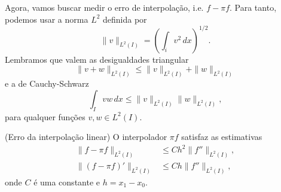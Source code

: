Agora, vamos buscar medir o erro de interpolação, i.e. $f - \pi f$. Para tanto, podemos usar a norma $L^2$ definida por
\begin{equation}
  \|v\|_{L^2(I)} = \left(\int_i v^2\, dx\right)^{1/2}.
\end{equation}
Lembramos que valem as desigualdades triangular
\begin{equation}
  \|v+w\|_{L^2(I)} \leq \|v\|_{L^2(I)} +  \|w\|_{L^2(I)}
\end{equation}
e a de Cauchy-Schwarz
\begin{equation}\label{eq:Cauchy-Schwarz}
  \int_I vw\,dx \leq \|v\|_{L^2(I)}\|w\|_{L^2(I)},
\end{equation}
para qualquer funções $v,w\in L^2(I)$.

\begin{prop}\normalfont(Erro da interpolação linear)\label{prop:interp_lin}
  O interpolador $\pi f$ satisfaz as estimativas
  \begin{align}
    \|f-\pi f\|_{L^2(I)} &\leq Ch^2\|f''\|_{L^2(I)},\\
    \|(f-\pi f)'\|_{L^2(I)} &\leq Ch\|f''\|_{L^2(I)},
  \end{align}
onde $C$ é uma constante e $h=x_1-x_0$.
\end{prop}
